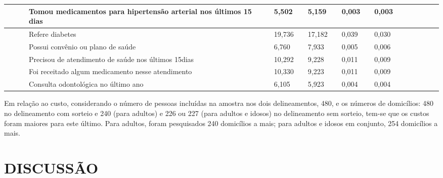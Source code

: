\documentclass{article}
\begin{document}
\begin{tabular}{| l | l | l | l | l | l || l | l | l | l || l | l | l | l | l | l | l | l |}
 & 
 & %
 & Tomou medicamentos para hipertensão arterial nos últimos 15 dias
 & %
 & 5,502
 & %
 & 5,159
 & %
 & 0,003
 & %
 & 0,003
\\ \hline 

 & 
 & %
 & Refere diabetes
 & %
 & 19,736
 & %
 & 17,182
 & %
 & 0,039
 & %
 & 0,030
\\ \hline 

 & 
 & %
 & Possui convênio ou plano de saúde
 & %
 & 6,760
 & %
 & 7,933
 & %
 & 0,005
 & %
 & 0,006
\\ \hline 

 & 
 & %
 & Precisou de atendimento de saúde nos últimos 15dias
 & %
 & 10,292
 & %
 & 9,228
 & %
 & 0,011
 & %
 & 0,009
\\ \hline 

 & 
 & %
 & Foi receitado algum medicamento nesse atendimento
 & %
 & 10,330
 & %
 & 9,223
 & %
 & 0,011
 & %
 & 0,009
\\ \hline 

 & 
 & %
 & Consulta odontológica no último ano
 & %
 & 6,105
 & %
 & 5,923
 & %
 & 0,004
 & %
 & 0,004
\\ \hline 


\end{tabular}


Em relação ao custo, considerando o número de pessoas incluídas na amostra nos dois delineamentos, 480, e os números de domicílios: 480 no delineamento com sorteio e 240 (para adultos) e 226 ou 227 (para adultos e idosos) no delineamento sem sorteio, tem-se que os custos foram maiores para este último. Para adultos, foram pesquisados 240 domicílios a mais; para adultos e idosos em conjunto, 254 domicílios a mais.


\section{%
DISCUSSÃO}
\end{document}

